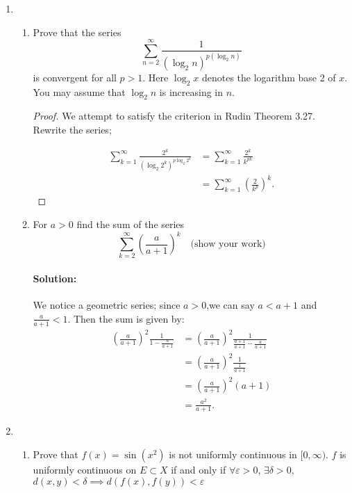 \documentclass{article}
\begin{document}
\begin{enumerate} 

\item \begin{enumerate}
        \item Prove that the series $$\sum_{n=2}^\infty\frac1{(\log_2n)^{p(\log_2n)}}$$
        is convergent for all $p>1.$ Here $\log_2x$ denotes the logarithm base 2 of $x.$ You may assume
        that $\log_2n$ is increasing in $n.$

        \begin{proof} 
            We attempt to satisfy the criterion in Rudin Theorem 3.27. Rewrite the series; 
            
            \begin{align*}
                \sum_{k=1}^{\infty} \frac{2^k}{\left(\log_2 2^k\right)^{p\log_2 2^k}}&= \sum_{k=1}^{\infty} \frac{2^{k}}{k^{pk}}\\
                &= \sum_{k=1}^{\infty} \left( \frac{2}{k^{p}} \right) ^{k} %
            .\end{align*}
        \end{proof}

        \item For $a>0$ find the sum of the series
        $$\sum_{k=2}^\infty\left(\frac a{a+1}\right)^k\quad\text{(show your work)}$$

        \paragraph{Solution: }We notice a geometric series; since $a>0$,we can say $a<a+1$ and $\frac{a}{a+1}<1$.
        Then the sum is given by:
        \begin{align*}
            \left(\frac{a}{a+1}\right)^2 \frac{1}{1-\frac{a}{a+1}}
            &= \left(\frac{a}{a+1}\right)^2 \frac{1}{\frac{a+1}{a+1}-\frac{a}{a+1}}\\
            &= \left(\frac{a}{a+1}\right)^2 \frac{1}{\frac{1}{a+1}}\\
            &= \left(\frac{a}{a+1}\right)^2 (a+1)\\
            &=\frac{a^2}{a+1}
        .\end{align*}

    \end{enumerate}
    \newpage
\item \begin{enumerate}
        \item Prove that $f\left(x\right)=\sin\left(x^{2}\right)$ is not uniformly continuous in $[0,\infty).$
            $f$ is uniformly continuous on $E\subset X$ if and only if $\forall\varepsilon>0$, $\exists \delta>0$, $d(x,y)<\delta\implies d(f(x),f(y))<\varepsilon$


\end{enumerate}
\end{enumerate}
\end{document}
